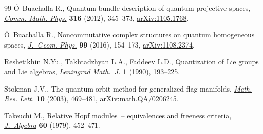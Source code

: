 \begin{thebibliography}{99}
\'O~Buachalla R., Quantum bundle description of quantum projective spaces,
 \href{https://doi.org/10.1007/s00220-012-1577-x}{\textit{Comm. Math. Phys.}} \textbf{316} (2012), 345--373, \href{https://arxiv.org/abs/1105.1768}{arXiv:1105.1768}.

\'O~Buachalla R., Noncommutative complex structures on quantum homogeneous
 spaces, \href{https://doi.org/10.1016/j.geomphys.2015.10.003}{\textit{J.~Geom. Phys.}} \textbf{99} (2016), 154--173,
 \href{https://arxiv.org/abs/1108.2374}{arXiv:1108.2374}.

Reshetikhin N.Yu., Takhtadzhyan L.A., Faddeev L.D., Quantization of {L}ie groups
 and {L}ie algebras, \textit{Leningrad Math.~J.} \textbf{1} (1990), 193--225.

Stokman J.V., The quantum orbit method for generalized flag manifolds,
 \href{https://doi.org/10.4310/MRL.2003.v10.n4.a6}{\textit{Math. Res. Lett.}} \textbf{10} (2003), 469--481,
 \href{https://arxiv.org/abs/math.QA/0206245}{arXiv:math.QA/0206245}.

Takeuchi M., Relative {H}opf modules~-- equivalences and freeness criteria,
 \href{https://doi.org/10.1016/0021-8693(79)90093-0}{\textit{J.~Algebra}} \textbf{60} (1979), 452--471.

\end{thebibliography}
